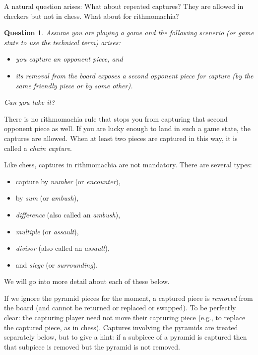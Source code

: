 \documentclass[14pt]{extarticle}
\newtheorem{question}{Question}
\begin{document}
A natural question arises: What about repeated captures?
They are allowed in checkers but not in chess.
What about for rithmomachia?

\begin{question}
Assume you are playing a game and the following scenerio (or game state to use the
technical term) arises:

\begin{itemize}
\item[(a)]
you capture an opponent piece, and

\item[(b)]
its removal from the board exposes a second opponent piece for capture
(by the same friendly piece or by some other).
\end{itemize}
Can you take it?
\end{question}

There is no rithmomachia rule that stops you from capturing that second opponent
piece as well. If you are lucky enough to land in such a game state, the captures
are allowed.
 When at least two pieces are captured in this way,
it is called a {\it chain capture}.

Like chess, captures in rithmomachia are not mandatory. There are several types:
\begin{itemize}
\item
capture by {\it number} (or {\it encounter}),
\item
by {\it sum} (or {\it ambush}),
\item
{\it difference} (also called an {\it ambush}),
\item
{\it multiple} (or {\it assault}),
\item
{\it divisor} (also called an {\it assault}),
\item
and {\it siege} (or {\it surrounding}).
\end{itemize}
We will go into more detail about each of these below.

If we ignore the pyramid pieces for the moment,
a captured piece is {\it removed} from the board (and cannot be
returned or replaced or swapped). To be perfectly clear:
the capturing player need not move
their capturing piece (e.g., to replace the captured piece,
as in chess).
Captures involving the pyramids are treated separately below,
but to give a hint: if a subpiece of a pyramid is captured
then that subpiece is removed but the pyramid is not removed.
\end{document}
